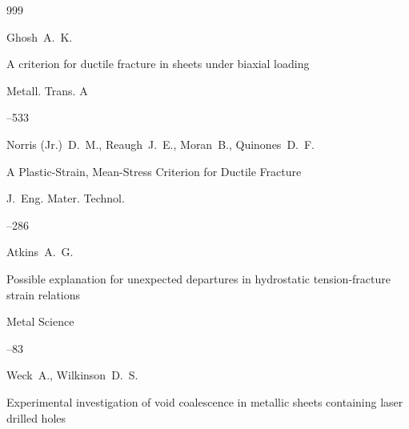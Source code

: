 \begin{thebibliography}{999}








\by Ghosh~A.~K. 

\paper A criterion for ductile fracture in sheets under biaxial loading

\jour Metall. Trans. A




–533






\by  Norris (Jr.)~D.~M., Reaugh~J.~E., Moran~B., Quinones~D.~F.

\paper A Plastic-Strain, Mean-Stress Criterion for Ductile Fracture

\jour J.~Eng. Mater. Technol.




–286






\by Atkins~A.~G. 

\paper Possible explanation for unexpected departures in hydrostatic tension-fracture strain relations

\jour Metal Science




--83






\by Weck~A., Wilkinson~D.~S. 

\paper Experimental investigation of void coalescence in metallic sheets containing laser drilled holes


\end{thebibliography}
